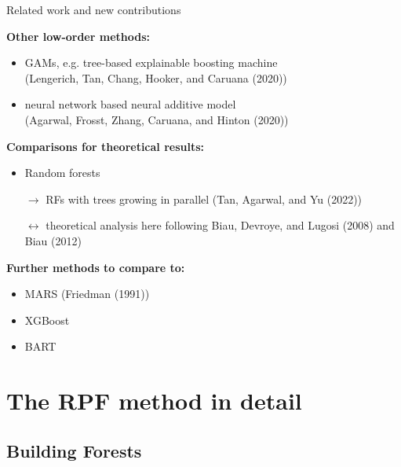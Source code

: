 \documentclass{beamer}
\begin{document}
\begin{frame}{Related work and new contributions}
    
    \textbf{Other low-order methods:}
    \begin{itemize}
        \item GAMs, e.g. tree-based explainable boosting machine\\
        (Lengerich, Tan, Chang, Hooker, and Caruana (2020))
        \item neural network based neural additive model\\
        (Agarwal, Frosst, Zhang, Caruana, and Hinton (2020))
    \end{itemize}

    \textbf{Comparisons for theoretical results:}
    \begin{itemize}
        \item Random forests
        \item[\(\rightarrow\)] RFs with trees growing in parallel (Tan, Agarwal, and Yu (2022))
        \item[\(\leftrightarrow\)] theoretical analysis here following Biau, Devroye, and Lugosi (2008) and Biau (2012)
    \end{itemize}

    \textbf{Further methods to compare to:}
    \begin{itemize}
        \item MARS (Friedman (1991))
        \item XGBoost
        \item BART
    \end{itemize}
    
\vspace{1cm}

\end{frame}



\section{The RPF method in detail}





\subsection{Building Forests}
\end{document}
